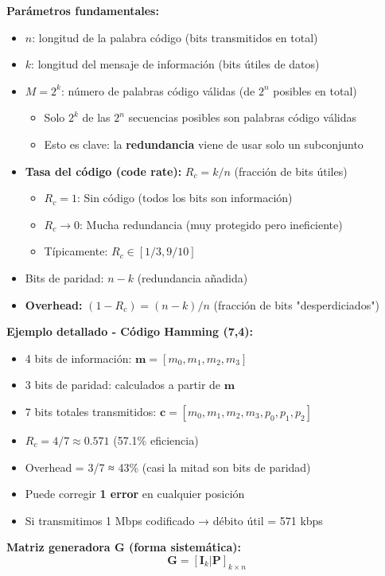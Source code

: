 \documentclass[10pt,a4paper]{article}
\begin{document}
\textbf{Parámetros fundamentales:}
\begin{itemize}
\item $n$: longitud de la palabra código (bits transmitidos en total)
\item $k$: longitud del mensaje de información (bits útiles de datos)
\item $M = 2^k$: número de palabras código válidas (de $2^n$ posibles en total)
  \begin{itemize}
  \item Solo $2^k$ de las $2^n$ secuencias posibles son palabras código válidas
  \item Esto es clave: la \textbf{redundancia} viene de usar solo un subconjunto
  \end{itemize}
\item \textbf{Tasa del código (code rate):} $R_c = k/n$ (fracción de bits útiles)
  \begin{itemize}
  \item $R_c = 1$: Sin código (todos los bits son información)
  \item $R_c \to 0$: Mucha redundancia (muy protegido pero ineficiente)
  \item Típicamente: $R_c \in [1/3, 9/10]$
  \end{itemize}
\item Bits de paridad: $n - k$ (redundancia añadida)
\item \textbf{Overhead:} $(1 - R_c) = (n-k)/n$ (fracción de bits "desperdiciados")
\end{itemize}

\textbf{Ejemplo detallado - Código Hamming (7,4):}
\begin{itemize}
\item 4 bits de información: $\mathbf{m} = [m_0, m_1, m_2, m_3]$
\item 3 bits de paridad: calculados a partir de $\mathbf{m}$
\item 7 bits totales transmitidos: $\mathbf{c} = [m_0, m_1, m_2, m_3, p_0, p_1, p_2]$
\item $R_c = 4/7 \approx 0.571$ (57.1\% eficiencia)
\item Overhead = 3/7 ≈ 43\% (casi la mitad son bits de paridad)
\item Puede corregir \textbf{1 error} en cualquier posición
\item Si transmitimos 1 Mbps codificado → débito útil = 571 kbps
\end{itemize}

\textbf{Matriz generadora $\mathbf{G}$ (forma sistemática):}
$$\mathbf{G} = [\mathbf{I}_k | \mathbf{P}]_{k \times n}$$
\end{document}
